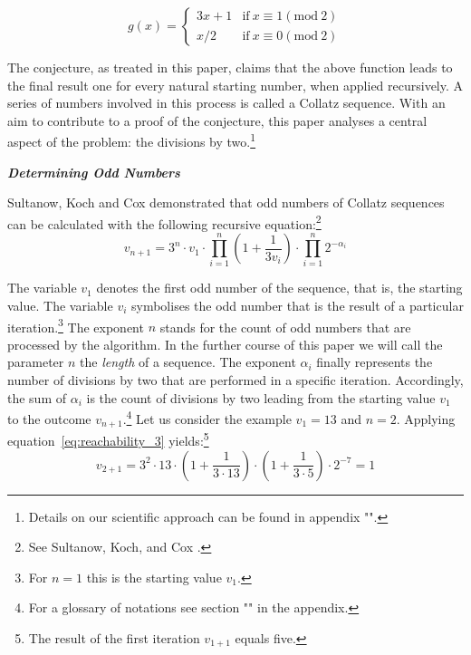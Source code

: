 \documentclass{SciPress_2015}
\renewcommand{\subsection}[1]{\textit{\textbf{#1}}}
\begin{document}
\begin{equation}
\label{eq:func_collatz}
g(x)=
\begin{cases}
3x+1	&	\text{if}\ x\equiv 1(\textrm{mod}\ 2)\\
x/2		&	\text{if}\ x\equiv 0(\textrm{mod}\ 2)
\end{cases}
\end{equation}

The conjecture, as treated in this paper, claims that the above function leads to the final result one for every natural starting number, when applied recursively. A series of numbers involved in this process is called a Collatz sequence. With an aim to contribute to a proof of the conjecture, this paper analyses a central aspect of the problem: the divisions by two.\footnote{Details on our scientific approach can be found in appendix "".}

\vspace{1em}\noindent
\subsection{Determining Odd Numbers}
\par\noindent
Sultanow, Koch and Cox demonstrated that odd numbers of Collatz sequences can be calculated with the following recursive equation:\footnote{See Sultanow, Koch, and Cox \cite[p.~10]{Ref_Sultanow_Koch_Cox_2020}.}
\begin{equation}
\label{eq:reachability_3}
v_{n+1}=3^n\cdot v_1\cdot\prod_{i=1}^{n}\left(1+\frac{1}{3v_{i}}\right)\cdot\prod_{i=1}^{n}2^{-\alpha_i}
\end{equation}

The variable $v_1$ denotes the first odd number of the sequence, that is, the starting value. The variable $v_i$ symbolises the odd number that is the result of a particular iteration.\footnote{For $n=1$ this is the starting value $v_1$.} The exponent $n$ stands for the count of odd numbers that are processed by the algorithm. In the further course of this paper we will call the parameter $n$ the \textit{length} of a sequence. The exponent $\alpha_i$ finally represents the number of divisions by two that are performed in a specific iteration. Accordingly, the sum of $\alpha_i$ is the count of divisions by two leading from the starting value $v_1$ to the outcome $v_{n+1}$.\footnote{For a glossary of notations see section "" in the appendix.} Let us consider the example $v_1=13$ and $n=2$. Applying equation~\ref{eq:reachability_3} yields:\footnote{The result of the first iteration $v_{1+1}$ equals five.}
\[
v_{2+1}=3^2\cdot 13\cdot\left(1+\frac{1}{3\cdot13}\right)\cdot\left(1+\frac{1}{3\cdot5}\right)\cdot2^{-7}=1
\]
\end{document}
